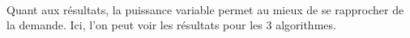 \begin{figure}
        \begin{minipage}{.5\textwidth}
        \end{minipage}
        \begin{minipage}{.5\textwidth}
        \end{minipage}
\end{figure}


\paragraph{} Quant aux résultats, la puissance variable permet au mieux de se rapprocher de la demande. Ici, l'on peut voir les résultats pour les 3 algorithmes.

